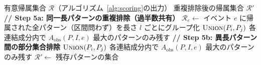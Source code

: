 \begin{algorithm}[!ht]
\caption{アイテム重複排除（Step 5）}
\label{alg:dedup}
\begin{algorithmic}[1]
\Require 有意帰属集合 $\mathcal{R}$（アルゴリズム~\ref{alg:scoring}の出力）
\Ensure 重複排除後の帰属集合 $\mathcal{R}'$
\Statex \textbf{// Step 5a: 同一長パターンの重複排除（過半数共有）}
    \State $\mathcal{R}_{e} \gets$ イベント $e$ に帰属された全パターン（区間問わず）を長さ $l$ ごとにグループ化
                \State $\Call{Union}{P_i, P_j}$ 
            \EndIf
        \EndFor
        \State 各連結成分内で $A_{\text{obs}}(P, I, e)$ 最大のパターンのみ残す
    \EndFor
\EndFor
\Statex \textbf{// Step 5b: 異長パターン間の部分集合排除}
            \State $\Call{Union}{P_i, P_j}$ 
        \EndIf
    \EndFor
    \State 各連結成分内で $A_{\text{obs}}(P, I, e)$ 最大のパターンのみ残す
\EndFor
\State \Return $\mathcal{R}' \gets$ 残存パターンの集合
\end{algorithmic}
\end{algorithm}
